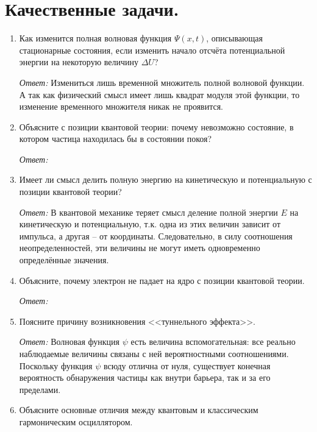 \section{Качественные задачи.}

\begin{enumerate}

\item Как изменится полная волновая функция \( \Psi(x,t) \), описывающая
стационарные состояния, если изменить начало отсчёта потенциальной энергии на
некоторую величину \( \Delta U \)?

\emph{Ответ:}
Измениться лишь временной множитель полной волновой функции. А так как
физический смысл имеет лишь квадрат модуля этой функции, то изменение временного
множителя никак не проявится.

\item Объясните с позиции квантовой теории: почему невозможно состояние, в
котором частица находилась бы в состоянии покоя?

\emph{Ответ:}

\item Имеет ли смысл делить полную энергию на кинетическую и потенциальную с
позиции квантовой теории?

\emph{Ответ:}
В квантовой механике теряет смысл деление полной энергии \( E \) на кинетическую
и потенциальную, т.к. одна из этих величин зависит от импульса, а другая -- от
координаты. Следовательно, в силу соотношения неопределенностей, эти величины не
могут иметь одновременно определённые значения.
        
\item Объясните, почему электрон не падает на ядро с позиции квантовой теории.

\emph{Ответ:}

\item Поясните причину возникновения <<туннельного эффекта>>.

\emph{Ответ:}
Волновая функция \( \psi \) есть величина вспомогательная: все реально
наблюдаемые величины связаны с ней вероятностными соотношениями. Поскольку
функция \( \psi \) всюду отлична от нуля, существует конечная вероятность
обнаружения частицы как внутри барьера, так и за его пределами.


\item Объясните основные отличия между квантовым и классическим гармоническим
осциллятором.


\end{enumerate}
